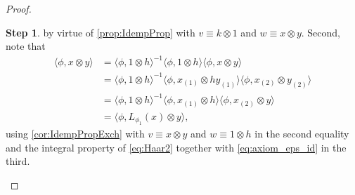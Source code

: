 \documentclass[a4paper,10pt]{amsart}
\newcommand{\eval}[2]{\langle #1 , #2\rangle}
\theoremstyle{definition}
\newtheorem{step-goursat}{Step}
\begin{document}
\begin{proof}
\begin{step-goursat}
        by virtue of \cref{prop:IdempProp} with $v\equiv k\otimes 1$ and $w\equiv x \otimes y$.
        Second, note that
        \begin{align*}
            \eval{\phi}{x \otimes y}
            &=
            \eval{\phi}{1 \otimes h}^{-1}
                \eval{\phi}{1 \otimes h}
                    \eval{\phi}{x \otimes y}
            \\
            &=
            \eval{\phi}{1\otimes h}^{-1}
                \eval{\phi}{x_{(1)}\otimes h y_{(1)}}
                    \eval{\phi}{x_{(2)}\otimes y_{(2)}}
            \\
            &=
            \eval{\phi}{1\otimes h}^{-1}
                \eval{\phi}{x_{(1)}\otimes h}
                    \eval{\phi}{x_{(2)}\otimes y}
            \\
            &=
            \eval{\phi}{L_{\phi_1}(x)\otimes y},
        \end{align*}
        using \cref{cor:IdempPropExch} with $v\equiv x\otimes y$ and $w\equiv 1\otimes h$ in the second equality and the integral property of \cref{eq:Haar2} together with \cref{eq:axiom_eps_id} in the third. 
    \end{step-goursat}
    

\end{proof}
\end{document}
